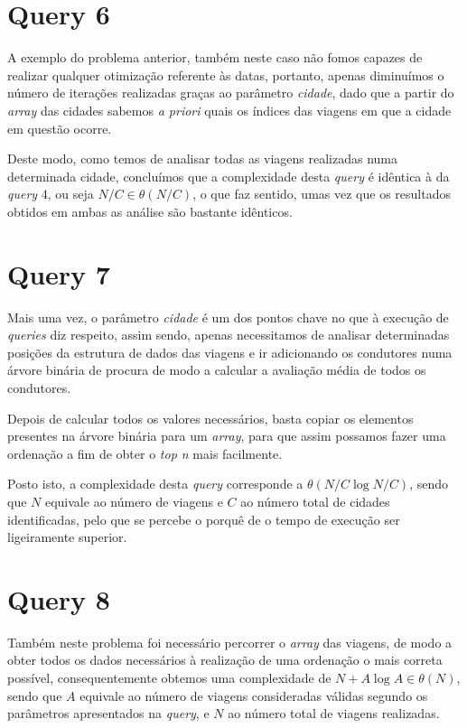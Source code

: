 \documentclass[12pt,a4paper]{report}
\begin{document}
\section{Query 6}

A exemplo do problema anterior, também neste caso não fomos capazes de realizar qualquer otimização referente às datas, portanto, apenas diminuímos o número de iterações realizadas graças ao parâmetro \textit{cidade}, dado que a partir do \textit{array} das cidades sabemos \textit{a priori} quais os índices das viagens em que a cidade em questão ocorre. 

Deste modo, como temos de analisar todas as viagens realizadas numa determinada cidade, concluímos que a complexidade desta \textit{query} é idêntica à da \textit{query} 4, ou seja \(N/C \in \theta(N/C)\), o que faz sentido, umas vez que os resultados obtidos em ambas as análise são bastante idênticos.

\section{Query 7}

Mais uma vez, o parâmetro \textit{cidade} é um dos pontos chave no que à execução de \textit{queries} diz respeito, assim sendo, apenas necessitamos de analisar determinadas posições da estrutura de dados das viagens e ir adicionando os condutores numa árvore binária de procura de modo a calcular a avaliação média de todos os condutores.

Depois de calcular todos os valores necessários, basta copiar os elementos presentes na árvore binária para um \textit{array}, para que assim possamos fazer uma ordenação a fim de obter o \textit{top n} mais facilmente.

Posto isto, a complexidade desta \textit{query} corresponde a \(\theta(N/C\log N/C)\), sendo que \(N\) equivale ao número de viagens e \(C\) ao número total de cidades identificadas, pelo que se percebe o porquê de o tempo de execução ser ligeiramente superior.

\section{Query 8}

Também neste problema foi necessário percorrer o \textit{array} das viagens, de modo a obter todos os dados necessários à realização de uma ordenação o mais correta possível, consequentemente obtemos uma complexidade de \(N + A\log A \in \theta(N)\), sendo que \(A\) equivale ao número de viagens consideradas válidas segundo os parâmetros apresentados na \textit{query}, e \(N\) ao número total de viagens realizadas.
\end{document}
